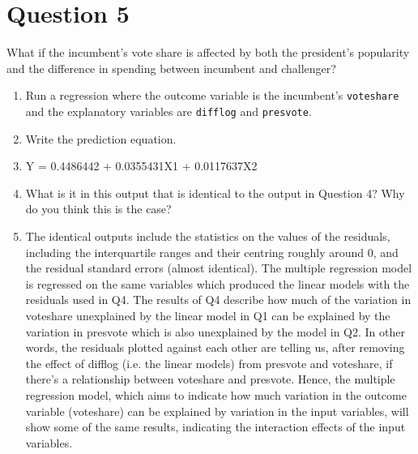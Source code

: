 \documentclass[12pt,letterpaper]{article}
\begin{document}
\section*{Question 5}
\noindent What if the incumbent's vote share is affected by both the president's popularity and the difference in spending between incumbent and challenger? 
	\begin{enumerate}
		\item Run a regression where the outcome variable is the incumbent's \texttt{voteshare} and the explanatory variables are \texttt{difflog} and \texttt{presvote}.
		
		\item Write the prediction equation.
		\item[] Y = 0.4486442 + 0.0355431X1 + 0.0117637X2
		\item What is it in this output that is identical to the output in Question 4? Why do you think this is the case?
		\item[] The identical outputs include the statistics on the values of the residuals, including the interquartile ranges and their centring roughly around 0, and  the residual standard errors (almost identical). The multiple regression model is regressed on the same variables which produced the linear models with the residuals used in Q4. The results of Q4 describe how much of the variation in voteshare unexplained by the linear model in Q1 can be explained by the variation in presvote which is also unexplained by the model in Q2. In other words, the residuals plotted against each other are telling us, after removing the effect of difflog (i.e. the linear models) from presvote and voteshare, if there's a relationship between voteshare and presvote. Hence, the multiple regression model, which aims to indicate how much variation in the outcome variable (voteshare) can be explained by variation in the input variables, will show some of the same results, indicating the interaction effects of the input variables. 
	\end{enumerate}
\end{document}
